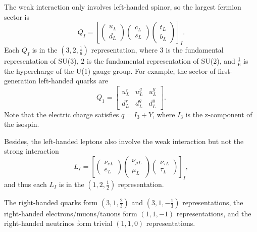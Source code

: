 \documentclass[aps,rmp,twocolumn,superscriptaddress,nofootinbib]{revtex4-2}
\begin{document}
The weak interaction only involves left-handed spinor, so the largest fermion sector is
\begin{equation}
	Q_I = \left[
		\begin{pmatrix} u_L \\ d_L \end{pmatrix} 
		\begin{pmatrix} c_L \\ s_L \end{pmatrix} 
		\begin{pmatrix} t_L \\ b_L \end{pmatrix}
	\right]_I.
\end{equation}
Each $Q_I$ is in the $\left(3,2,\frac{1}{6}\right)$ representation, where $3$ is the fundamental representation of SU(3), $2$ is the fundamental representation of SU(2), and $\frac{1}{6}$ is the hypercharge of the U(1) gauge group.
For example, the sector of first-generation left-handed quarks are
\begin{equation}
	Q_1 = \begin{bmatrix}
		u_L^r & u_L^g & u_L^y \\ d_L^r & d_L^g & d_L^y
	\end{bmatrix}.
\end{equation}
Note that the electric charge satisfies $q = I_3 + Y$, where $I_3$ is the z-component of the isospin.

Besides, the left-handed leptons also involve the weak interaction but not the strong interaction
\begin{equation}
	L_I = \left[
		\begin{pmatrix} \nu_{e L} \\ e_L \end{pmatrix} 
		\begin{pmatrix} \nu_{\mu L} \\ \mu_L \end{pmatrix} 
		\begin{pmatrix} \nu_{\tau L} \\ \tau_L \end{pmatrix}
	\right]_I,
\end{equation}
and thus each $L_I$ is in the $\left(1,2,\frac{1}{2}\right)$ representation.

The right-handed quarks form $(3,1,\frac{2}{3})$ and $(3,1,-\frac{1}{3})$ representations, the right-handed electrons/muons/tauons form $(1,1,-1)$ representations, and the right-handed neutrinos form trivial $(1,1,0)$ representations.
\end{document}
